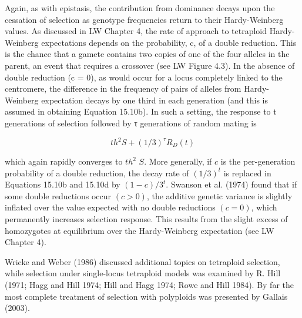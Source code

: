 \documentclass{article}
\begin{document}
Again, as with epistasis, the contribution from dominance decays upon the cessation of selection as genotype frequencies return to their Hardy-Weinberg values. As discussed in LW Chapter 4, the rate of approach to tetraploid Hardy-Weinberg expectations depends on the probability, c, of a double reduction. This is the chance that a gamete contains two copies of one of the four alleles in the parent, an event that requires a crossover (see LW Figure 4.3). In the absence of double reduction (c = 0), as would occur for a locus completely linked to the centromere, the difference in the frequency of pairs of alleles from Hardy-Weinberg expectation decays by one third in each generation (and this is assumed in obtaining Equation 15.10b). In such a setting, the response to t generations of selection followed by τ generations of random mating is

\begin{equation}
t h^{2}S+(1/3)^{\tau}R_{D}(t)
\tag{15.10d}
\label{eq:15_10d}
\end{equation}

which again rapidly converges to $t h^2$ $S$. More generally, if $c$ is the per-generation probability of a double reduction, the decay rate of $(1/3)^t$ is replaced in Equations 15.10b and 15.10d by $(1 - c)/3^t$. Swanson et al. (1974) found that if some double reductions occur $(c > 0)$, the additive genetic variance is slightly inflated over the value expected with no double reductions $(c = 0)$, which permanently increases selection response. This results from the slight excess of homozygotes at equilibrium over the Hardy-Weinberg expectation (see LW Chapter 4).

Wricke and Weber (1986) discussed additional topics on tetraploid selection, while selection under single-locus tetraploid models was examined by R. Hill (1971; Hagg and Hill 1974; Hill and Hagg 1974; Rowe and Hill 1984). By far the most complete treatment of selection with polyploids was presented by Gallais (2003).
\end{document}
